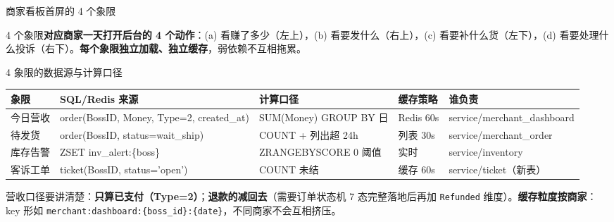 \documentclass[aspectratio=169,11pt]{beamer}
\begin{document}
\begin{frame}[shrink]{商家看板首屏的 4 个象限}
\vspace{2mm}
\small 4 个象限\textbf{对应商家一天打开后台的 4 个动作}：(a) 看赚了多少（左上），(b) 看要发什么（右上），(c) 看要补什么货（左下），(d) 看要处理什么投诉（右下）。\textbf{每个象限独立加载、独立缓存}，弱依赖不互相拖累。
\end{frame}

\begin{frame}[shrink]{4 象限的数据源与计算口径}
\scriptsize
\begin{tabular}{@{}lllll@{}}
\toprule
象限 & SQL/Redis 来源 & 计算口径 & 缓存策略 & 谁负责 \\
\midrule
今日营收 & order(BossID, Money, Type=2, created\_at) & SUM(Money) GROUP BY 日 & Redis 60s & service/merchant\_dashboard \\
待发货 & order(BossID, status=wait\_ship) & COUNT + 列出超 24h & 列表 30s & service/merchant\_order \\
库存告警 & ZSET inv\_alert:\{boss\} & ZRANGEBYSCORE 0 阈值 & 实时 & service/inventory \\
客诉工单 & ticket(BossID, status='open') & COUNT 未结 & 缓存 60s & service/ticket（新表） \\
\bottomrule
\end{tabular}

\medskip
{\scriptsize 营收口径要讲清楚：\textbf{只算已支付（Type=2）}；\textbf{退款的减回去}（需要订单状态机 7 态完整落地后再加 \texttt{Refunded} 维度）。\textbf{缓存粒度按商家}：key 形如 \texttt{merchant:dashboard:\{boss\_id\}:\{date\}}，不同商家不会互相挤压。}
\end{frame}
\end{document}

